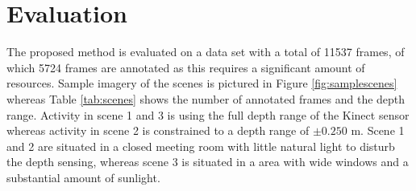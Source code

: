 \documentclass[10pt,twocolumn,letterpaper]{article}
\begin{document}
%
%
%



\section{Evaluation}
\label{sec:evaluation}
The proposed method is evaluated on a data set with a total of 11537 frames, of which 5724 frames are annotated as this requires a significant amount of resources. Sample imagery of the scenes is pictured in Figure \ref{fig:samplescenes} whereas Table \ref{tab:scenes} shows the number of annotated frames and the depth range. Activity in scene 1 and 3 is using the full depth range of the Kinect sensor whereas activity in scene 2 is constrained to a depth range of $\pm 0.250$ m. Scene 1 and 2 are situated in a closed meeting room with little natural light to disturb the depth sensing, whereas scene 3 is situated in a area with wide windows and a substantial amount of sunlight.
\end{document}
